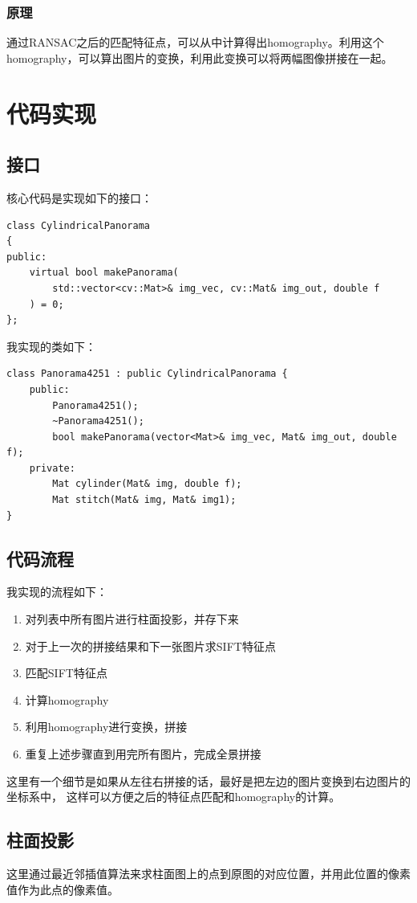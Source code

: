 \documentclass{article}
\begin{document}
\subsubsection{原理}
通过RANSAC之后的匹配特征点，可以从中计算得出homography。利用这个homography，可以算出图片的变换，利用此变换可以将两幅图像拼接在一起。

\section{代码实现}
\subsection{接口}
核心代码是实现如下的接口：
\begin{lstlisting}
class CylindricalPanorama
{
public:
    virtual bool makePanorama(
        std::vector<cv::Mat>& img_vec, cv::Mat& img_out, double f
    ) = 0;
};
\end{lstlisting}
我实现的类如下：
\begin{lstlisting}
class Panorama4251 : public CylindricalPanorama {
    public:
        Panorama4251();
        ~Panorama4251();
        bool makePanorama(vector<Mat>& img_vec, Mat& img_out, double f);
    private:
        Mat cylinder(Mat& img, double f);
        Mat stitch(Mat& img, Mat& img1);
}
\end{lstlisting}
\subsection{代码流程}
我实现的流程如下：
\begin{enumerate}  
    \item 对列表中所有图片进行柱面投影，并存下来
    \item 对于上一次的拼接结果和下一张图片求SIFT特征点
    \item 匹配SIFT特征点
    \item 计算homography
    \item 利用homography进行变换，拼接
    \item 重复上述步骤直到用完所有图片，完成全景拼接
\end{enumerate}
这里有一个细节是如果从左往右拼接的话，最好是把左边的图片变换到右边图片的坐标系中，
这样可以方便之后的特征点匹配和homography的计算。
\subsection{柱面投影}
这里通过最近邻插值算法来求柱面图上的点到原图的对应位置，并用此位置的像素值作为此点的像素值。
\end{document}
